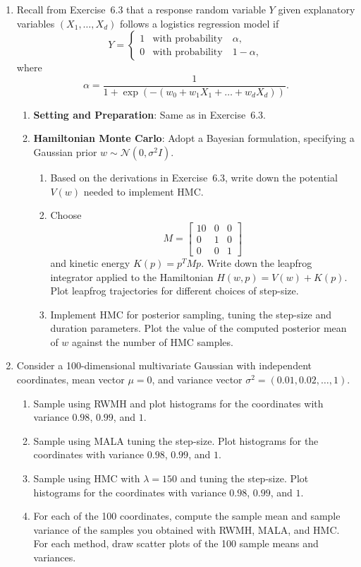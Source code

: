\begin{enumerate}
\item[8.3] Recall from Exercise~6.3 that a response random variable $Y$ given explanatory
variables $(X_1, \ldots, X_d)$ follows a logistics regression model if
\[
Y = \begin{cases} 1 & \text{with probability}\quad \alpha, \\ 0 & \text{with probability}\quad 1 - \alpha, \end{cases}
\]
where
\[
\alpha = \frac{1}{1 + \exp\!\left(-(w_0 + w_1 X_1 + \ldots + w_d X_d)\right)}.
\]
\begin{enumerate}
  \item \textbf{Setting and Preparation}: Same as in Exercise~6.3.
  \item \textbf{Hamiltonian Monte Carlo}: Adopt a Bayesian formulation, specifying a Gaussian
    prior $w \sim \mathcal{N}(0, \sigma^2 I)$.
  \begin{enumerate}
    \item[(b)] Based on the derivations in Exercise~6.3, write down the potential $V(w)$ needed
      to implement HMC.
    \item[(c)] Choose
      \[
        M = \begin{bmatrix} 10 & 0 & 0 \\ 0 & 1 & 0 \\ 0 & 0 & 1 \end{bmatrix}
      \]
      and kinetic energy $K(p) = p^T M p$. Write down the leapfrog integrator applied to the
      Hamiltonian $H(w,p) = V(w) + K(p)$. Plot leapfrog trajectories for different choices of
      step-size.
    \item[(d)] Implement HMC for posterior sampling, tuning the step-size and duration
      parameters. Plot the value of the computed posterior mean of $w$ against the number of
      HMC samples.
  \end{enumerate}
\end{enumerate}

\item[8.4] Consider a 100-dimensional multivariate Gaussian with independent coordinates, mean
vector $\mu = 0$, and variance vector $\sigma^2 = (0.01, 0.02, \ldots, 1)$.
\begin{enumerate}
  \item[(a)] Sample using RWMH and plot histograms for the coordinates with variance $0.98$,
    $0.99$, and $1$.
  \item[(b)] Sample using MALA tuning the step-size. Plot histograms for the coordinates with
    variance $0.98$, $0.99$, and $1$.
  \item[(c)] Sample using HMC with $\lambda = 150$ and tuning the step-size. Plot histograms
    for the coordinates with variance $0.98$, $0.99$, and $1$.
  \item[(d)] For each of the 100 coordinates, compute the sample mean and sample variance of
    the samples you obtained with RWMH, MALA, and HMC. For each method, draw scatter plots of
    the 100 sample means and variances.
\end{enumerate}

\end{enumerate}
